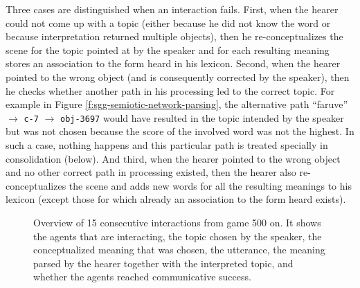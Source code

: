  Three cases are
distinguished when an interaction fails. First, when the hearer could
not come up with a topic (either because he did not know the word or
because interpretation returned multiple objects), then he
re-conceptualizes the scene for the topic pointed at by the speaker
and for each resulting meaning stores an association to the form heard
in his lexicon. Second, when the hearer pointed to the wrong object
(and is consequently corrected by the speaker), then he checks whether
another path in his processing led to the correct topic. For example
in Figure \ref{f:sgg-semiotic-network-parsing}, the alternative path
``faruve'' $\longrightarrow$ \texttt{c-7} $\longrightarrow$
\texttt{obj-3697} would have resulted in the topic intended by the
speaker but was not chosen because the score of the involved word was
not the highest. In such a case, nothing happens and this particular
path is treated specially in consolidation (below). And third, when
the hearer pointed to the wrong object and no other correct path in
processing existed, then the hearer also re-conceptualizes the scene
and adds new words for all the resulting meanings to his lexicon
(except those for which already an association to the form heard
exists).

\begin{figure}[t]
  
  \caption{Overview of 15 consecutive interactions from game 500
    on. It shows the agents that are interacting, the topic chosen by
    the speaker, the conceptualized meaning that was chosen, the
    utterance, the meaning parsed by the hearer together with the
    interpreted topic, and whether the agents reached communicative
    success.}
  \label{f:sgg-sw-unstructured-trace}
\end{figure}

